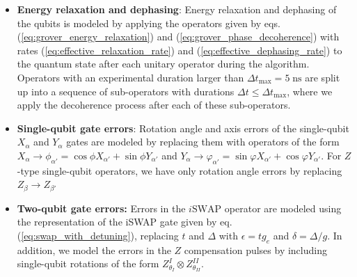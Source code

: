\begin{itemize}
 \item {\bf Energy relaxation and dephasing}: Energy relaxation and dephasing of the qubits is modeled by applying the operators given by eqs. (\ref{eq:grover_energy_relaxation}) and (\ref{eq:grover_phase_decoherence}) with rates (\ref{eq:effective_relaxation_rate}) and (\ref{eq:effective_dephasing_rate}) to the quantum state after each unitary operator during the algorithm. Operators with an experimental duration larger than $\Delta t_\mathrm{max}=5\;\mathrm{ns}$ are split up into a sequence of sub-operators with durations $\Delta t \le \Delta t_\mathrm{max}$, where we apply the decoherence process after each of these sub-operators.
 \item {\bf Single-qubit gate errors}: Rotation angle and axis errors of the single-qubit $X_\alpha$ and $Y_\alpha$ gates are modeled by replacing them with operators of the form $X_\alpha\to \phi_{\alpha'} = \cos{\phi}X_{\alpha'}+\sin{\phi}Y_{\alpha'}$ and $Y_\alpha \to \varphi_{\alpha'} = \sin{\varphi}X_{\alpha'}+\cos{\varphi}Y_{\alpha'}$. For $Z$-type single-qubit operators, we have only rotation angle errors by replacing $Z_\beta \to Z_{\beta'}$ 
 \item {\bf Two-qubit gate errors:} Errors in the $i\mathrm{SWAP}$ operator are modeled using the representation of the iSWAP gate given by eq. (\ref{eq:swap_with_detuning}), replacing $t$ and $\Delta$ with $\epsilon = t g_{e}$ and $\delta = \Delta / g$. In addition, we model the errors in the $Z$ compensation pulses by including single-qubit rotations of the form $Z_{\theta_I}^I\otimes Z_{\theta_{II}}^{II}$.
\end{itemize}

